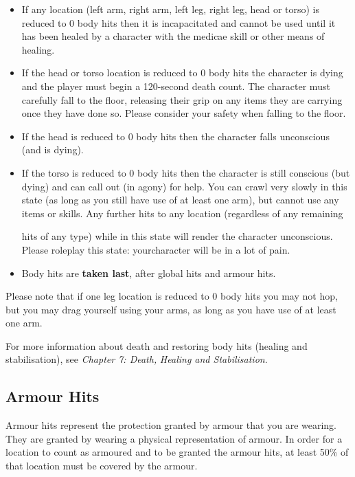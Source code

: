 \begin{itemize}
\item If any location (left arm, right arm, left leg, right leg, head or torso) is reduced to 0 body hits then it is incapacitated and cannot be used until it has been healed by a character with the medicae skill or other means of healing.

\item If the head or torso location is reduced to 0 body hits the character is dying and the player must begin a 120-second death count. The character must carefully fall to the floor, releasing their grip on any items they are carrying once they have done so. Please consider your safety when falling to the floor.

\item If the head is reduced to 0 body hits then the character falls unconscious (and is dying).

\item If the torso is reduced to 0 body hits then the character is still conscious (but dying) and can call out (in agony) for help. You can crawl very slowly in this state (as long as you still have use of at least one arm), but cannot use any items or skills. Any further hits to any location (regardless of any remaining

hits of any type) while in this state will render the character unconscious. Please roleplay this state: yourcharacter will be in a lot of pain.

\item Body hits are \textbf{taken last}, after global hits and armour hits.

\end{itemize}
Please note that if one leg location is reduced to 0 body hits you may not hop, but you may drag yourself using your arms, as long as you have use of at least one arm.

For more information about death and restoring body hits (healing and stabilisation), see \textit{Chapter 7: Death,} \textit{Healing and Stabilisation}.

\subsection{Armour Hits}

Armour hits represent the protection granted by armour that you are wearing. They are granted by wearing a physical representation of armour. In order for a location to count as armoured and to be granted the armour hits, at least 50\% of that location must be covered by the armour.


